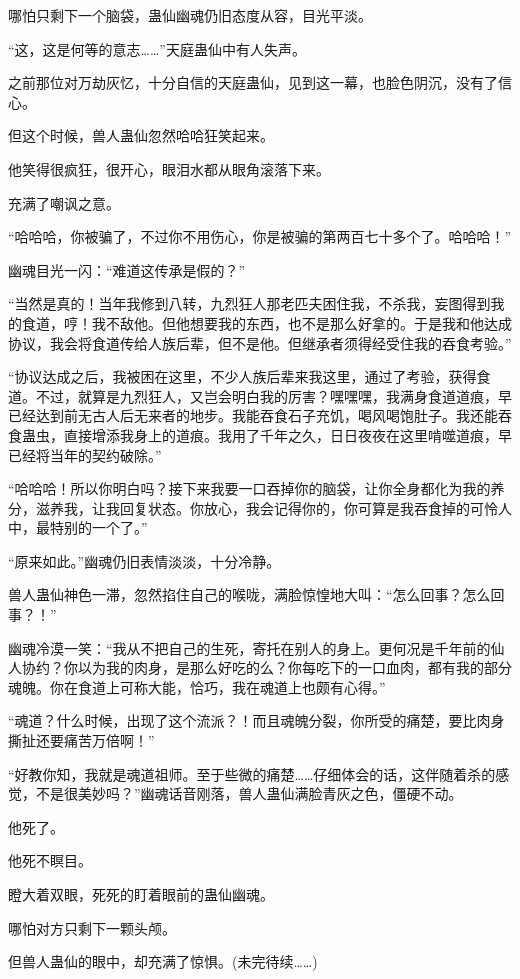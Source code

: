 \begin{this_body}
哪怕只剩下一个脑袋，蛊仙幽魂仍旧态度从容，目光平淡。

“这，这是何等的意志……”天庭蛊仙中有人失声。

之前那位对万劫灰忆，十分自信的天庭蛊仙，见到这一幕，也脸色阴沉，没有了信心。

但这个时候，兽人蛊仙忽然哈哈狂笑起来。

他笑得很疯狂，很开心，眼泪水都从眼角滚落下来。

充满了嘲讽之意。

“哈哈哈，你被骗了，不过你不用伤心，你是被骗的第两百七十多个了。哈哈哈！”

幽魂目光一闪：“难道这传承是假的？”

“当然是真的！当年我修到八转，九烈狂人那老匹夫困住我，不杀我，妄图得到我的食道，哼！我不敌他。但他想要我的东西，也不是那么好拿的。于是我和他达成协议，我会将食道传给人族后辈，但不是他。但继承者须得经受住我的吞食考验。”

“协议达成之后，我被困在这里，不少人族后辈来我这里，通过了考验，获得食道。不过，就算是九烈狂人，又岂会明白我的厉害？嘿嘿嘿，我满身食道道痕，早已经达到前无古人后无来者的地步。我能吞食石子充饥，喝风喝饱肚子。我还能吞食蛊虫，直接增添我身上的道痕。我用了千年之久，日日夜夜在这里啃噬道痕，早已经将当年的契约破除。”

“哈哈哈！所以你明白吗？接下来我要一口吞掉你的脑袋，让你全身都化为我的养分，滋养我，让我回复状态。你放心，我会记得你的，你可算是我吞食掉的可怜人中，最特别的一个了。”

“原来如此。”幽魂仍旧表情淡淡，十分冷静。

兽人蛊仙神色一滞，忽然掐住自己的喉咙，满脸惊惶地大叫：“怎么回事？怎么回事？！”

幽魂冷漠一笑：“我从不把自己的生死，寄托在别人的身上。更何况是千年前的仙人协约？你以为我的肉身，是那么好吃的么？你每吃下的一口血肉，都有我的部分魂魄。你在食道上可称大能，恰巧，我在魂道上也颇有心得。”

“魂道？什么时候，出现了这个流派？！而且魂魄分裂，你所受的痛楚，要比肉身撕扯还要痛苦万倍啊！”

“好教你知，我就是魂道祖师。至于些微的痛楚……仔细体会的话，这伴随着杀的感觉，不是很美妙吗？”幽魂话音刚落，兽人蛊仙满脸青灰之色，僵硬不动。

他死了。

他死不瞑目。

瞪大着双眼，死死的盯着眼前的蛊仙幽魂。

哪怕对方只剩下一颗头颅。

但兽人蛊仙的眼中，却充满了惊惧。(未完待续……)

\end{this_body}

